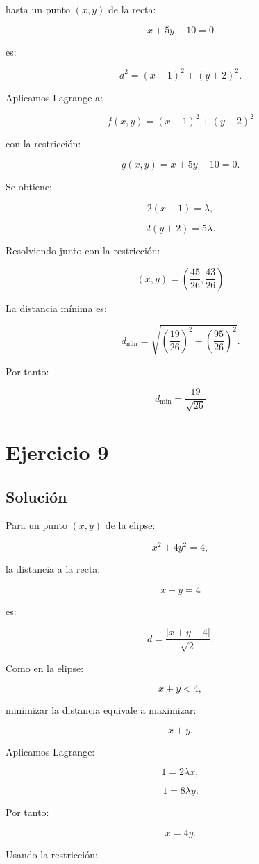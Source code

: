 \documentclass[11pt,a4paper]{article}
\begin{document}
hasta un punto \((x,y)\) de la recta:

\[
x+5y-10=0
\]

es:

\[
d^2
=
(x-1)^2+(y+2)^2.
\]

Aplicamos Lagrange a:

\[
f(x,y)
=
(x-1)^2+(y+2)^2
\]

con la restricción:

\[
g(x,y)=x+5y-10=0.
\]

Se obtiene:

\[
2(x-1)=\lambda,
\]

\[
2(y+2)=5\lambda.
\]

Resolviendo junto con la restricción:

\[
\boxed{
(x,y)
=
\left(
\frac{45}{26},
\frac{43}{26}
\right)
}
\]

La distancia mínima es:

\[
d_{\min}
=
\sqrt{
\left(\frac{19}{26}\right)^2
+
\left(\frac{95}{26}\right)^2
}.
\]

Por tanto:

\[
\boxed{
d_{\min}
=
\frac{19}{\sqrt{26}}
}
\]

\section{Ejercicio 9}
\subsection{Solución}

Para un punto \((x,y)\) de la elipse:

\[
x^2+4y^2=4,
\]

la distancia a la recta:

\[
x+y=4
\]

es:

\[
d
=
\frac{|x+y-4|}{\sqrt2}.
\]

Como en la elipse:

\[
x+y<4,
\]

minimizar la distancia equivale a maximizar:

\[
x+y.
\]

Aplicamos Lagrange:

\[
1=2\lambda x,
\]

\[
1=8\lambda y.
\]

Por tanto:

\[
x=4y.
\]

Usando la restricción:
\end{document}
